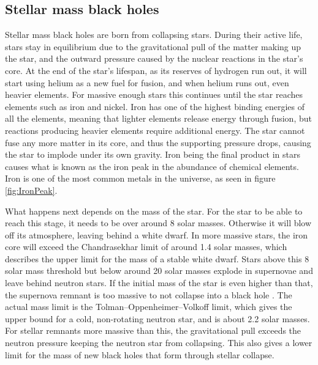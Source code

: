 \documentclass[english, oneside]{HYgradu}
\begin{document}

\subsection{Stellar mass black holes}

Stellar mass black holes are born from collapsing stars. During their active life, stars stay in equilibrium due to the gravitational pull of the matter making up the star, and the outward pressure caused by the nuclear reactions in the star's core. At the end of the star's lifespan, as its reserves of hydrogen run out, it will start using helium as a new fuel for fusion, and when helium runs out, even heavier elements. For massive enough stars this continues until the star reaches elements such as iron and nickel. Iron has one of the highest binding energies of all the elements, meaning that lighter elements release energy through fusion, but reactions producing heavier elements require additional energy. The star cannot fuse any more matter in its core, and thus the supporting pressure drops, causing the star to implode under its own gravity. Iron being the final product in stars causes what is known as the iron peak in the abundance of chemical elements. Iron is one of the most common metals in the universe, as seen in figure \ref{fig:IronPeak}.

What happens next depends on the mass of the star. For the star to be able to reach this stage, it needs to be over around 8 solar masses. Otherwise it will blow off its atmosphere, leaving behind a white dwarf. In more massive stars, the iron core will exceed the Chandrasekhar limit of around 1.4 solar masses, which describes the upper limit for the mass of a stable white dwarf. Stars above this 8 solar mass threshold but below around 20 solar masses explode in supernovae and leave behind neutron stars. If the initial mass of the star is even higher than that, the supernova remnant is too massive to not collapse into a black hole \citep{woosley:2002}. The actual mass limit is the Tolman–Oppenheimer–Volkoff limit, which gives the upper bound for a cold, non-rotating neutron star, and is about 2.2 solar masses. For stellar remnants more massive than this, the gravitational pull exceeds the neutron pressure keeping the neutron star from collapsing. This also gives a lower limit for the mass of new black holes that form through stellar collapse.
\end{document}
